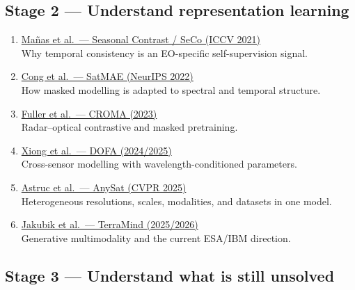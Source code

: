 \documentclass[
  a4paper,
  11pt]{article}
\begin{document}
\hypertarget{stage-2-understand-representation-learning}{%
\subsection{Stage 2 --- Understand representation
learning}\label{stage-2-understand-representation-learning}}

\begin{enumerate}
\def\labelenumi{\arabic{enumi}.}
\setcounter{enumi}{3}
\item
  \href{https://openaccess.thecvf.com/content/ICCV2021/papers/Manas_Seasonal_Contrast_Unsupervised_Pre-Training_From_Uncurated_Remote_Sensing_Data_ICCV_2021_paper.pdf}{Mañas
  et al.~--- Seasonal Contrast / SeCo (ICCV 2021)}\\
  Why temporal consistency is an EO-specific self-supervision signal.
\item
  \href{https://proceedings.neurips.cc/paper_files/paper/2022/hash/01c561df365429f33fcd7a7faa44c985-Abstract-Conference.html}{Cong
  et al.~--- SatMAE (NeurIPS 2022)}\\
  How masked modelling is adapted to spectral and temporal structure.
\item
  \href{https://arxiv.org/abs/2311.00566}{Fuller et al.~--- CROMA
  (2023)}\\
  Radar--optical contrastive and masked pretraining.
\item
  \href{https://arxiv.org/abs/2403.15356}{Xiong et al.~--- DOFA
  (2024/2025)}\\
  Cross-sensor modelling with wavelength-conditioned parameters.
\item
  \href{https://arxiv.org/abs/2412.14123}{Astruc et al.~--- AnySat (CVPR
  2025)}\\
  Heterogeneous resolutions, scales, modalities, and datasets in one
  model.
\item
  \href{https://arxiv.org/html/2504.11171v5}{Jakubik et al.~---
  TerraMind (2025/2026)}\\
  Generative multimodality and the current ESA/IBM direction.
\end{enumerate}

\hypertarget{stage-3-understand-what-is-still-unsolved}{%
\subsection{Stage 3 --- Understand what is still
unsolved}\label{stage-3-understand-what-is-still-unsolved}}
\end{document}
